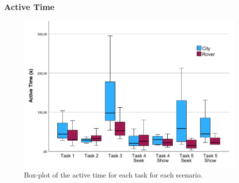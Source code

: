         \subsubsection{Active Time}


            \begin{figure}[h]
                \centering
                \includegraphics[width=1\linewidth]{figures/active_time_graph.pdf}
                \caption{Box-plot of the active time for each task for each scenario.}
                \label{fig:active_time}
            \end{figure}


